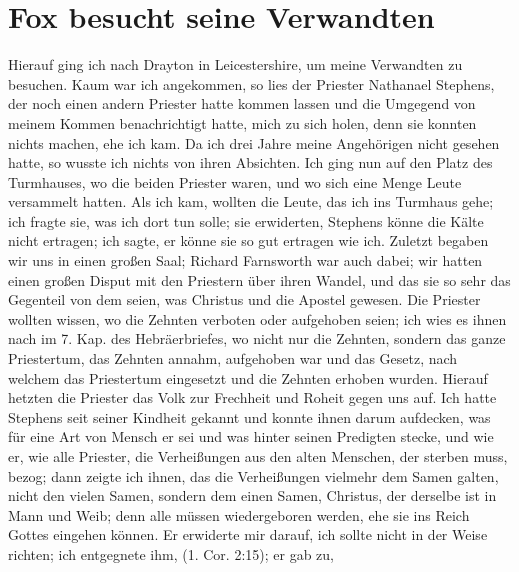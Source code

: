 \section{Fox besucht seine Verwandten}

Hierauf ging ich nach Drayton in 
Leicestershire, um meine
Verwandten zu besuchen. Kaum war ich angekommen, so lies
der Priester Nathanael Stephens, 
der noch einen andern Priester
hatte kommen lassen und die Umgegend von meinem Kommen
benachrichtigt hatte, mich zu sich holen, denn sie konnten nichts
machen, ehe ich kam. Da ich drei Jahre meine Angehörigen
nicht gesehen hatte, so wusste ich nichts von ihren Absichten. Ich
ging nun auf den Platz des Turmhauses, wo die beiden
Priester waren, und wo sich eine Menge Leute versammelt hatten.
Als ich kam, wollten die Leute, das ich ins Turmhaus gehe; ich
fragte sie, was ich dort tun solle; sie erwiderten, Stephens
könne die Kälte nicht ertragen; ich sagte, er könne sie so gut
ertragen wie ich. Zuletzt begaben wir uns in einen großen Saal;
Richard Farnsworth war auch dabei; 
wir hatten einen großen
Disput mit den Priestern über ihren Wandel, und das sie so
sehr das Gegenteil von dem seien, was Christus und die Apostel
gewesen. Die Priester wollten wissen, wo die 
Zehnten verboten
oder aufgehoben seien; ich wies es ihnen nach im 7. Kap. des
Hebräerbriefes, wo nicht nur die 
Zehnten, sondern das ganze
Priestertum, das Zehnten 
annahm, aufgehoben war und das
Gesetz, nach welchem das Priestertum eingesetzt und die Zehnten
erhoben wurden. Hierauf hetzten die Priester das Volk zur 
Frechheit und Roheit gegen uns auf. Ich hatte Stephens seit seiner
Kindheit gekannt und konnte ihnen darum aufdecken, was für
eine Art von Mensch er sei und was hinter seinen Predigten
stecke, und wie er, wie alle Priester, die Verheißungen aus den
alten Menschen, der sterben muss, bezog; dann zeigte ich ihnen,
das die Verheißungen vielmehr dem Samen galten, nicht den
vielen Samen, sondern dem einen Samen, Christus, der derselbe
ist in Mann und Weib; denn 
alle müssen wiedergeboren werden,
ehe sie ins Reich Gottes eingehen 
können. Er erwiderte mir
darauf, ich sollte nicht in der Weise richten; 
ich entgegnete ihm,
(1. Cor. 2:15); er gab zu, 
